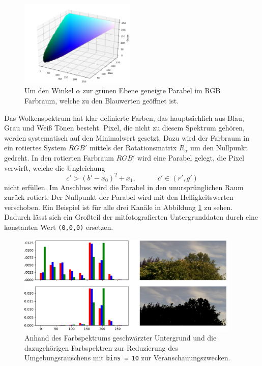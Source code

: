 \begin{figure}
		\centering
		\includegraphics[width=0.49\textwidth]{pictures/cut_cube.pdf}
		\caption{Um den Winkel $\alpha$ zur grünen Ebene geneigte Parabel im RGB 
				Farbraum, welche zu den Blauwerten geöffnet ist.}
				\label{fig:parabular}
\end{figure}
Das Wolkenspektrum hat klar definierte Farben, das hauptsächlich aus Blau, Grau
und Weiß Tönen besteht.
Pixel, die nicht zu diesem Spektrum gehören, werden systematisch auf den
Minimalwert gesetzt.
Dazu wird der Farbraum in ein rotiertes System $RGB'$ mittels der 
Rotationsmatrix $R_{\alpha}$ um den Nullpunkt gedreht. 
In den rotierten Farbraum $RGB'$ wird eine Parabel gelegt, die Pixel
verwirft, welche die Ungleichung 
\begin{equation}
		c' > (b' - x_0)^2 + x_1, \hspace{3em} c' \in (r', g')
\end{equation}
nicht erfüllen.
Im Anschluss wird die Parabel in den unursprünglichen Raum zurück
rotiert.
Der Nullpunkt der Parabel wird mit den Helligkeitswerten verschoben.
Ein Beispiel ist für alle drei Kanäle in Abbildung \ref{fig:parabular} zu sehen.
Dadurch lässt sich ein Großteil der mitfotografierten Untergrunddaten durch
eine konstanten Wert \texttt{(0,0,0)} ersetzen.
\begin{figure}
		\centering
		\includegraphics[width=0.95\textwidth]{pictures/cut_hist.pdf}
		\caption{Anhand des Farbspektrums geschwärzter Untergrund und die
		dazugehörigen Farbspektren zur Reduzierung des Umgebungsrauschens mit
		\texttt{bins = 10} zur Veranschauungszwecken.}
		\label{fig:name}
\end{figure}

